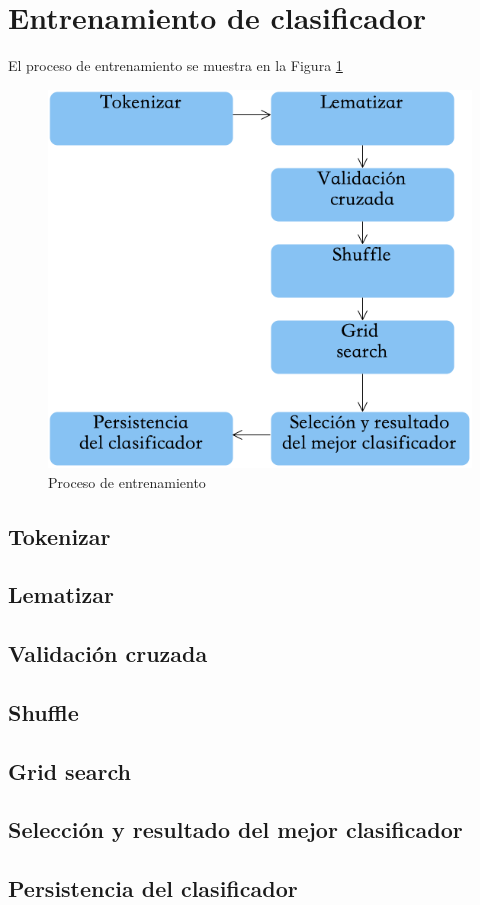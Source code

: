 \section[Entrenamiento]{Entrenamiento de clasificador}

El proceso de entrenamiento se muestra en la Figura \ref{fig:cp5:procesoE}

\begin{figure}[H]
\centering
\includegraphics[scale=.45]{imagenes/capitulo5/entrenamiento.png}
\caption{Proceso de entrenamiento}
\label{fig:cp5:procesoE}
\end{figure}



\subsection{Tokenizar}
\subsection{Lematizar}
\subsection{Validación cruzada}
\subsection{Shuffle}
\subsection{Grid search}
\subsection[Resultados]{Selección y resultado del mejor clasificador}
\subsection[Persistencia]{Persistencia del clasificador}